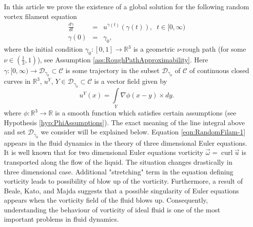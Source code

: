 \documentclass[11pt,a4paper,leqno]{amsart}%
\theoremstyle{plain}
\theoremstyle{remark}
\theoremstyle{plain}
\numberwithin{equation}{section}
\newcommand\curl{\operatorname{curl}}
\def\Rnu{{\mathbb R}}
\def\intl{\int\limits}
\begin{document}
In this article we prove the existence of a global solution for the following random
vortex filament equation
\begin{eqnarray}
\frac{d\gamma}{dt} &=& u^{\gamma(t)}(\gamma(t)), \;\; t\in [0,\infty) \label{eqn:RandomFilam-1}\\
\gamma(0) &=& \gamma_0,\label{eqn:RandomFilam-2}
\end{eqnarray}
where the initial condition $\gamma_0:[0,1]\to\mathbb{R}^3$ is a  geometric $\nu$-rough path (for some  $\nu\in(\frac{1}{3},1)$),  see Assumption \ref{ass:RoughPathApproximability}. Here $\gamma:[0,\infty)\to \mathcal{D}_{\gamma_0}\subset\mathcal{C}$ is some trajectory in
the subset $\mathcal{D}_{\gamma_0}$ of $\mathcal{C}$ of continuous closed curves in
$\Rnu^3$, $u^Y$, $Y\in \mathcal{D}_{\gamma_0}\subset\mathcal{C}$ is a vector field
given by
\begin{equation}
u^Y(x)=\intl_Y\nabla\phi(x-y)\times dy.\label{eqn:RandomFilam-3}
\end{equation}
where $\phi:\Rnu^3\to\Rnu$ is a smooth function which satisfies
certain assumptions (see Hypothesis \ref{hyp:PhiAssumptions}).
The exact meaning of the line integral above and set $\mathcal{D}_{\gamma_0}$ we consider
will be explained below. Equation \eqref{eqn:RandomFilam-1} appears in the fluid dynamics in
the theory of three dimensional Euler equations.
It is well known that for two dimensional Euler equations vorticity $\vec{\omega}=\curl \vec{u}$ is transported along the flow of the liquid.
The situation changes drastically in three dimensional case. Additional "stretching" term in the equation defining vorticity
leads to possibility of blow up of the vorticity.
Furthermore, a result of Beale,
Kato, and Majda \cite{[BKM-1984]} suggests that a possible
singularity of Euler equations appears when the vorticity field of the 
fluid blows up. Consequently, understanding the behaviour of vorticity of ideal fluid is
one of the most important problems in fluid dynamics.
\end{document}

